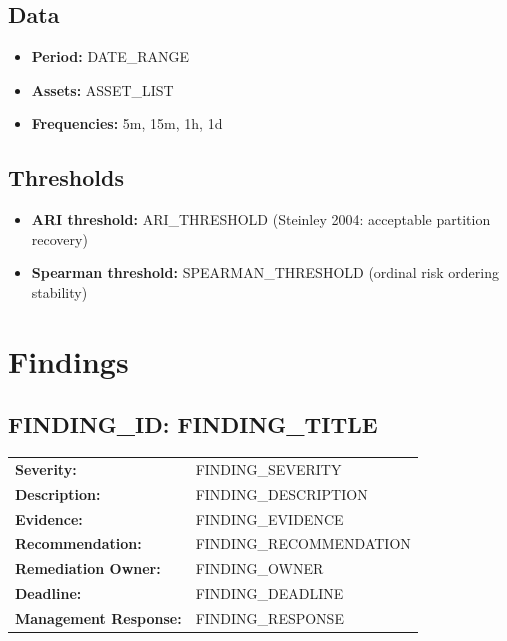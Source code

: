 \documentclass[11pt,a4paper]{article}
\begin{document}
\subsection{Data}
\begin{itemize}[leftmargin=*]
\item \textbf{Period:} {{DATE_RANGE}}
\item \textbf{Assets:} {{ASSET_LIST}}
\item \textbf{Frequencies:} 5m, 15m, 1h, 1d
\end{itemize}

\subsection{Thresholds}
\begin{itemize}[leftmargin=*]
\item \textbf{ARI threshold:} {{ARI_THRESHOLD}} (Steinley 2004: acceptable partition recovery)
\item \textbf{Spearman threshold:} {{SPEARMAN_THRESHOLD}} (ordinal risk ordering stability)
\end{itemize}

\section{Findings}

\subsection{{{FINDING_ID}}: {{FINDING_TITLE}}}
\begin{tabularx}{\textwidth}{lX}
\textbf{Severity:} & \textcolor{sev{{FINDING_SEVERITY_LC}}}{{{FINDING_SEVERITY}}} \\
\textbf{Description:} & {{FINDING_DESCRIPTION}} \\
\textbf{Evidence:} & {{FINDING_EVIDENCE}} \\
\textbf{Recommendation:} & {{FINDING_RECOMMENDATION}} \\
\textbf{Remediation Owner:} & {{FINDING_OWNER}} \\
\textbf{Deadline:} & {{FINDING_DEADLINE}} \\
\textbf{Management Response:} & {{FINDING_RESPONSE}} \\
\end{tabularx}
\vspace{0.5cm}
\end{document}
